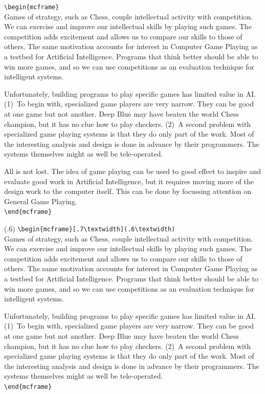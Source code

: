 \documentclass{book}\usepackage[]{graphicx}\usepackage[]{color}
\begin{document}
\begin{mcframe}
\verb+\begin{mcframe}+\\
Games of strategy, such as Chess, couple intellectual activity with
competition.
We can exercise and improve our intellectual skills by playing such games.
The competition adds excitement and allows us to
compare our skills to those of others.
The same motivation accounts for
interest in Computer Game Playing as a testbed for Artificial Intelligence.
Programs that think better should be able to win more
games, and so we can use competitions as an evaluation technique for
intelligent systems.

Unfortunately, building programs to play specific games has limited
value in AI.  (1)~To begin with, specialized game players are very narrow.
They can be good at one game but not another. Deep Blue may have beaten
the world Chess champion, but it has no clue how to play checkers.  (2)~A
second problem with specialized game playing systems is that they do only
part of the work. Most of the interesting analysis and design is done in
advance by their programmers. The systems themselves might as well be
tele-operated.

All is not lost. The idea of game playing can be used to good effect
to inspire and evaluate good work in Artificial Intelligence, but it
requires moving more of the design work to the computer itself.
This can be done by focussing attention on General Game Playing.\\
\verb+\end{mcframe}+
\end{mcframe}

\begin{mcframe}[.7\textwidth](.6\textwidth)
\verb+\begin{mcframe}[.7\textwidth](.6\textwidth)+\\
Games of strategy, such as Chess, couple intellectual activity with
competition.
We can exercise and improve our intellectual skills by playing such games.
The competition adds excitement and allows us to
compare our skills to those of others.
The same motivation accounts for
interest in Computer Game Playing as a testbed for Artificial Intelligence.
Programs that think better should be able to win more
games, and so we can use competitions as an evaluation technique for
intelligent systems.

Unfortunately, building programs to play specific games has limited
value in AI.  (1)~To begin with, specialized game players are very narrow.
They can be good at one game but not another. Deep Blue may have beaten
the world Chess champion, but it has no clue how to play checkers.  (2)~A
second problem with specialized game playing systems is that they do only
part of the work. Most of the interesting analysis and design is done in
advance by their programmers. The systems themselves might as well be
tele-operated.\\
\verb+\end{mcframe}+
\end{mcframe}
\end{document}

